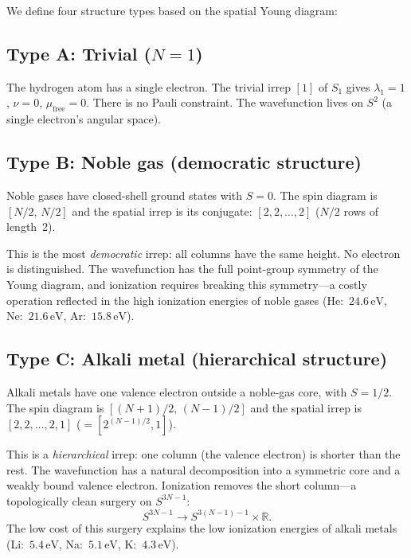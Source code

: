 \documentclass[aps,prl,twocolumn,superscriptaddress,longbibliography]{revtex4-2}
\newcommand{\mufree}{\mu_{\mathrm{free}}}
\newcommand{\eV}{\,\mathrm{eV}}
\begin{document}
We define four structure types based on the spatial Young diagram:

\subsection{Type A: Trivial ($N = 1$)}

The hydrogen atom has a single electron.  The trivial irrep $[1]$ of
$S_1$ gives $\lambda_1 = 1$, $\nu = 0$, $\mufree = 0$.  There is no
Pauli constraint.  The wavefunction lives on $S^2$ (a single
electron's angular space).

\subsection{Type B: Noble gas (democratic structure)}

Noble gases have closed-shell ground states with $S = 0$.  The spin
diagram is $[N/2,\, N/2]$ and the spatial irrep is its conjugate:
$[2, 2, \ldots, 2]$ ($N/2$ rows of length~2).

This is the most \emph{democratic} irrep: all columns have the same
height.  No electron is distinguished.  The wavefunction has the full
point-group symmetry of the Young diagram, and ionization requires
breaking this symmetry---a costly operation reflected in the high
ionization energies of noble gases (He:~$24.6\eV$, Ne:~$21.6\eV$,
Ar:~$15.8\eV$).

\subsection{Type C: Alkali metal (hierarchical structure)}

Alkali metals have one valence electron outside a noble-gas core, with
$S = 1/2$.  The spin diagram is $[(N+1)/2, \,(N-1)/2]$ and the
spatial irrep is $[2, 2, \ldots, 2, 1]$ ($= [2^{(N-1)/2}, 1]$).

This is a \emph{hierarchical} irrep: one column (the valence electron)
is shorter than the rest.  The wavefunction has a natural
decomposition into a symmetric core and a weakly bound valence
electron.  Ionization removes the short column---a topologically clean
surgery on $S^{3N-1}$:
\begin{equation}
  S^{3N-1} \to S^{3(N-1)-1} \times \mathbb{R}.
  \label{eq:ionization_surgery}
\end{equation}
The low cost of this surgery explains the low ionization energies
of alkali metals (Li:~$5.4\eV$, Na:~$5.1\eV$, K:~$4.3\eV$).
\end{document}
